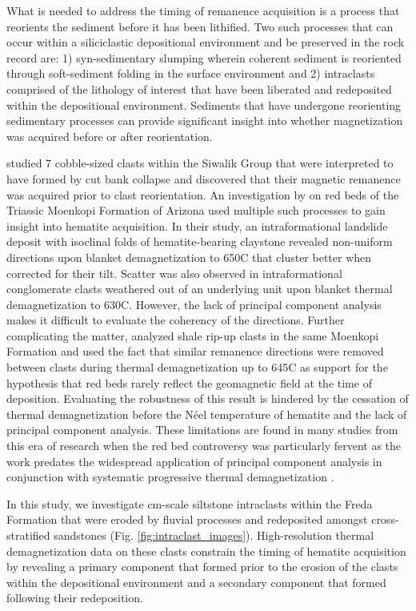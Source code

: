 \documentclass[11pt,letterpaper]{article}
\begin{document}
What is needed to address the timing of remanence acquisition is a process that reorients the sediment before it has been lithified. Two such processes that can occur within a siliciclastic depositional environment and be preserved in the rock record are: 1) syn-sedimentary slumping wherein coherent sediment is reoriented through soft-sediment folding in the surface environment and 2) intraclasts comprised of the lithology of interest that have been liberated and redeposited within the depositional environment. Sediments that have undergone reorienting sedimentary processes can provide significant insight into whether magnetization was acquired before or after reorientation.

\cite{Tauxe1980a} studied 7 cobble-sized clasts within the Siwalik Group that were interpreted to have formed by cut bank collapse and discovered that their magnetic remanence was acquired prior to clast reorientation. An investigation by \cite{Purucker1980a} on red beds of the Triassic Moenkopi Formation of Arizona used multiple such processes to gain insight into hematite acquisition. In their study, an intraformational landslide deposit with isoclinal folds of hematite-bearing claystone revealed non-uniform directions upon blanket demagnetization to 650\textdegree C that cluster better when corrected for their tilt. Scatter was also observed in intraformational conglomerate clasts weathered out of an underlying unit upon blanket thermal demagnetization to 630\textdegree C. However, the lack of principal component analysis makes it difficult to evaluate the coherency of the directions. Further complicating the matter, \cite{Larson1982b} analyzed shale rip-up clasts in the same Moenkopi Formation and used the fact that similar remanence directions were removed between clasts during thermal demagnetization up to 645\textdegree C as support for the hypothesis that red beds rarely reflect the geomagnetic field at the time of deposition. Evaluating the robustness of this result is hindered by the cessation of thermal demagnetization before the N\'eel temperature of hematite and the lack of principal component analysis. These limitations are found in many studies from this era of research when the red bed controversy was particularly fervent as the work predates the widespread application of principal component analysis in conjunction with systematic progressive thermal demagnetization \citep{Kirschvink1980a, Van-Der-Voo2012a}.

In this study, we investigate cm-scale siltstone intraclasts within the Freda Formation that were eroded by fluvial processes and redeposited amongst cross-stratified sandstones (Fig. \ref{fig:intraclast_images}). High-resolution thermal demagnetization data on these clasts constrain the timing of hematite acquisition by revealing a primary component that formed prior to the erosion of the clasts within the depositional environment and a secondary component that formed following their redeposition.
\end{document}
